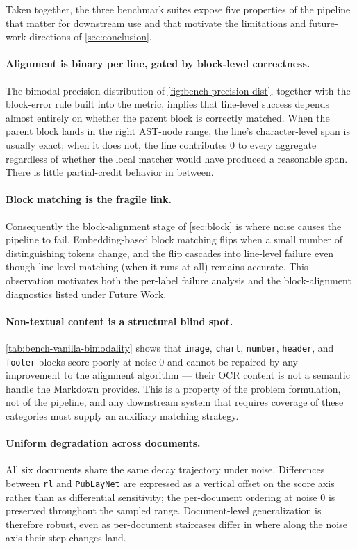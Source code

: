 \documentclass{article}
\theoremstyle{definition}
\begin{document}
Taken together, the three benchmark suites expose five properties of
the pipeline that matter for downstream use and that motivate the
limitations and future-work directions of \cref{sec:conclusion}.

\paragraph{Alignment is binary per line, gated by block-level
      correctness.}  The bimodal precision distribution of
\cref{fig:bench-precision-dist}, together with the block-error rule
built into the metric, implies that line-level success depends almost
entirely on whether the parent block is correctly matched.  When the
parent block lands in the right AST-node range, the line's
character-level span is usually exact; when it does not, the line
contributes $0$ to every aggregate regardless of whether the local
matcher would have produced a reasonable span.  There is little
partial-credit behavior in between.

\paragraph{Block matching is the fragile link.}  Consequently the
block-alignment stage of \cref{sec:block} is where noise causes the
pipeline to fail.  Embedding-based block matching flips when a small
number of distinguishing tokens change, and the flip cascades into
line-level failure even though line-level matching (when it runs at
all) remains accurate.  This observation motivates both the per-label
failure analysis and the block-alignment diagnostics listed under
Future Work.

\paragraph{Non-textual content is a structural blind spot.}
\cref{tab:bench-vanilla-bimodality} shows that \texttt{image},
\texttt{chart}, \texttt{number}, \texttt{header}, and \texttt{footer}
blocks score poorly at noise $0$ and cannot be repaired by any
improvement to the alignment algorithm --- their OCR content is not a
semantic handle the Markdown provides.  This is a property of the
problem formulation, not of the pipeline, and any downstream system
that requires coverage of these categories must supply an auxiliary
matching strategy.

\paragraph{Uniform degradation across documents.}  All six documents
share the same decay trajectory under noise.  Differences between
\texttt{rl} and \texttt{PubLayNet} are expressed as a vertical offset
on the score axis rather than as differential sensitivity; the
per-document ordering at noise $0$ is preserved throughout the sampled
range.  Document-level generalization is therefore robust, even as
per-document staircases differ in where along the noise axis their
step-changes land.
\end{document}
